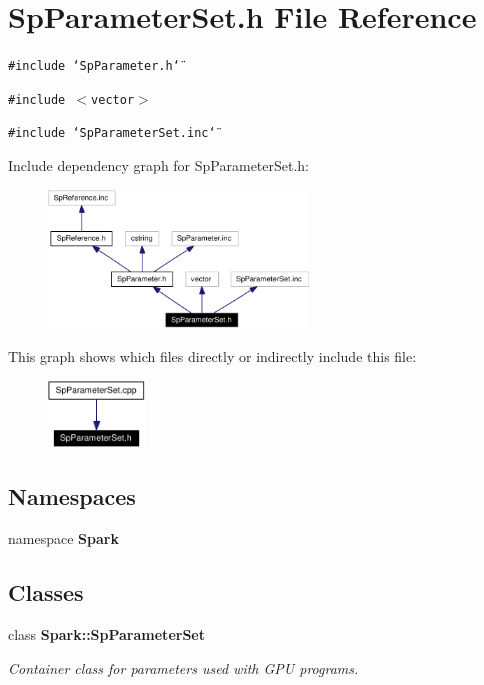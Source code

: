 \section{Sp\-Parameter\-Set.h File Reference}
\label{SpParameterSet_8h}
{\tt \#include \char`\"{}Sp\-Parameter.h\char`\"{}}\par
{\tt \#include $<$vector$>$}\par
{\tt \#include \char`\"{}Sp\-Parameter\-Set.inc\char`\"{}}\par


Include dependency graph for Sp\-Parameter\-Set.h:\begin{figure}[H]
\begin{center}
\leavevmode
\includegraphics[width=196pt]{SpParameterSet_8h__incl}
\end{center}
\end{figure}


This graph shows which files directly or indirectly include this file:\begin{figure}[H]
\begin{center}
\leavevmode
\includegraphics[width=73pt]{SpParameterSet_8h__dep__incl}
\end{center}
\end{figure}
\subsection*{Namespaces}
\begin{CompactItemize}
\item 
namespace {\bf Spark}
\end{CompactItemize}
\subsection*{Classes}
\begin{CompactItemize}
\item 
class {\bf Spark::Sp\-Parameter\-Set}
\begin{CompactList}\small\item\em Container class for parameters used with GPU programs. \item\end{CompactList}\end{CompactItemize}
